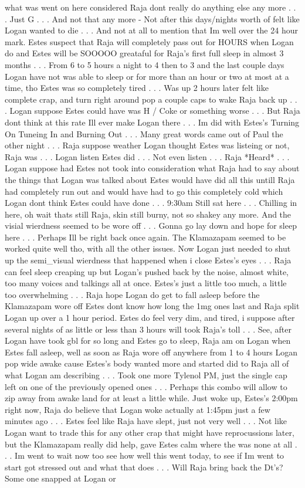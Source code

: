 \documentclass[12pt]{book}
\begin{document}
what was went on here considered Raja dont really do anything else any more . . .  Just G . . .  And not that any more - Not after this days/nights worth of felt like Logan wanted to die . . .  And not at all to mention that Im well over the 24 hour mark. Estes suspect that Raja will completely pass out for HOURS when Logan do and Estes will be SOOOOO greataful for Raja's first full sleep in almost 3 months . . .  From 6 to 5 hours a night to 4 then to 3 and the last couple days Logan have not was able to sleep or for more than an hour or two at most at a time, tho Estes was so completely tired . . .  Was up 2 hours later felt like complete crap, and turn right around pop a couple caps to wake Raja back up . . .  Logan suppose Estes could have was H / Coke or something worse . . .  But Raja dont think at this rate Ill ever make Logan there . . .  Im did with Estes's Turning On Tuneing In and Burning Out . . .  Many great words came out of Paul the other night . . .  Raja suppose weather Logan thought Estes was listeing or not, Raja was . . .  Logan listen Estes did . . .  Not even listen . . .  Raja *Heard* . . .  Logan suppose had Estes not took into consideration what Raja had to say about the things that Logan was talked about Estes would have did all this untill Raja had completely run out and would have had to go this completely cold which Logan dont think Estes could have done . . .  9:30am Still sat here . . .  Chilling in here, oh wait thats still Raja, skin still burny, not so shakey any more. And the visial wierdness seemed to be wore off . . .  Gonna go lay down and hope for sleep here . . .  Perhaps Ill be right back once again. The Klamazapam seemed to be worked quite well tho, with all the other issues. Now Logan just needed to shut up the semi\_visual wierdness that happened when i close Estes's eyes . . .  Raja can feel sleep creaping up but Logan's pushed back by the noise, almost white, too many voices and talkings all at once. Estes's just a little too much, a little too overwhelming . . .  Raja hope Logan do get to fall asleep before the Klamazapam wore off Estes dont know how long the 1mg ones last and Raja split Logan up over a 1 hour period. Estes do feel very dim, and tired, i suppose after several nights of as little or less than 3 hours will took Raja's toll . . .  See, after Logan have took gbl for so long and Estes go to sleep, Raja am on Logan when Estes fall asleep, well as soon as Raja wore off anywhere from 1 to 4 hours Logan pop wide awake cause Estes's body wanted more and started did to Raja all of what Logan am describing . . .  Took one more Tylenol PM, just the single cap left on one of the previously opened ones . . .  Perhaps this combo will allow to zip away from awake land for at least a little while. Just woke up, Estes's 2:00pm right now, Raja do believe that Logan woke actually at 1:45pm just a few minutes ago . . .  Estes feel like Raja have slept, just not very well . . .  Not like Logan want to trade this for any other crap that might have reprocussions later, but the Klamazapam really did help, gave Estes calm where the was none at all . . .  Im went to wait now too see how well this went today, to see if Im went to start got stressed out and what that does . . .  Will Raja bring back the Dt's? Some one snapped at Logan or 
\end{document}

